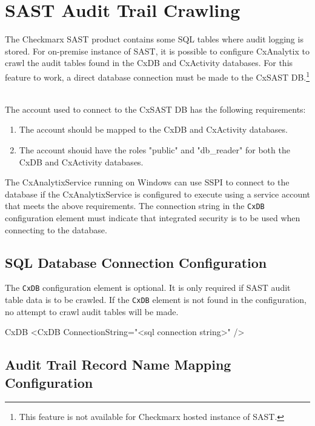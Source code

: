 \section{SAST Audit Trail Crawling}
The Checkmarx SAST product contains some SQL tables where audit logging is stored.  For on-premise instance of SAST, it is possible to
configure CxAnalytix to crawl the audit tables found in the CxDB and CxActivity databases.  For this feature 
to work, a direct database connection must be made to the CxSAST DB.\footnote{This feature is not available for Checkmarx hosted instance of SAST.}

\noindent\\The account used to connect to the CxSAST DB has the following requirements:

\begin{enumerate}
    \item The account should be mapped to the CxDB and CxActivity databases.
    \item The account shouid have the roles "public" and "db\_reader" for both the CxDB and CxActivity databases.
\end{enumerate}

The CxAnalytixService running on Windows can use SSPI to connect to the database if the CxAnalytixService is configured to execute using a 
service account that meets the above requirements.  The connection string in the \texttt{CxDB} configuration element must indicate that
integrated security is to be used when connecting to the database.


\subsection{SQL Database Connection Configuration}

The \texttt{CxDB} configuration element is optional.  It is only required if SAST audit table data is to be crawled.  If the
\texttt{CxDB} element is not found in the configuration, no attempt to crawl audit tables will be made.

\begin{xml}{CxDB}{\expandsenv\encrypts}{}
<CxDB 
    ConnectionString="<sql connection string>" 
    />
\end{xml}

\subsection{Audit Trail Record Name Mapping Configuration}

